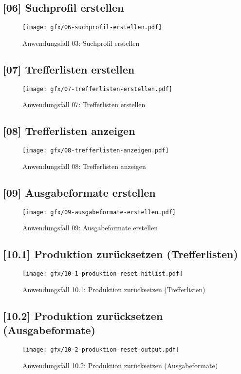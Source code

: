 \subsection{[06] Suchprofil erstellen}
\label{ch:SystemEntwurf:06}

\begin{figure}[H]
  \texttt{[image: gfx/06-suchprofil-erstellen.pdf]}
  \caption{Anwendungsfall 03: Suchprofil erstellen}
  \label{fig:AF06}
\end{figure}

\subsection{[07] Trefferlisten erstellen}
\label{ch:SystemEntwurf:07}

\begin{figure}[H]
  \texttt{[image: gfx/07-trefferlisten-erstellen.pdf]}
  \caption{Anwendungsfall 07: Trefferlisten erstellen}
  \label{fig:AF07}
\end{figure}

\subsection{[08] Trefferlisten anzeigen}

\begin{figure}[H]
  \texttt{[image: gfx/08-trefferlisten-anzeigen.pdf]}
  \caption{Anwendungsfall 08: Trefferlisten anzeigen}
  \label{fig:AF08}
\end{figure}

\subsection{[09] Ausgabeformate erstellen}

\begin{figure}[H]
  \texttt{[image: gfx/09-ausgabeformate-erstellen.pdf]}
  \caption{Anwendungsfall 09: Ausgabeformate erstellen}
  \label{fig:AF09}
\end{figure}

\subsection{[10.1] Produktion zurücksetzen (Trefferlisten)}

\begin{figure}[H]
  \texttt{[image: gfx/10-1-produktion-reset-hitlist.pdf]}
  \caption{Anwendungsfall 10.1: Produktion zurücksetzen (Trefferlisten)}
  \label{fig:AF10-1}
\end{figure}

\subsection{[10.2] Produktion zurücksetzen (Ausgabeformate)}

\begin{figure}[H]
  \texttt{[image: gfx/10-2-produktion-reset-output.pdf]}
  \caption{Anwendungsfall 10.2: Produktion zurücksetzen (Ausgabeformate)}
  \label{fig:AF10-2}
\end{figure}
